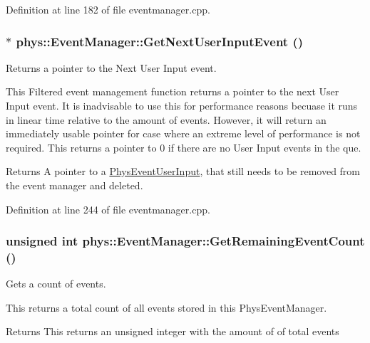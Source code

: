 Definition at line 182 of file eventmanager.cpp.

\hypertarget{classphys_1_1EventManager_ad61b660278f03702e0c564c7ad2dbc5d}{
\subsubsection[{GetNextUserInputEvent}]{ $\ast$ phys::EventManager::GetNextUserInputEvent ()}}
\label{da/dde/classphys_1_1EventManager_ad61b660278f03702e0c564c7ad2dbc5d}


Returns a pointer to the Next User Input event. 

This Filtered event management function returns a pointer to the next User Input event. It is inadvisable to use this for performance reasons becuase it runs in linear time relative to the amount of events. However, it will return an immediately usable pointer for case where an extreme level of performance is not required. This returns a pointer to 0 if there are no User Input events in the que. \begin{DoxyReturn}{Returns}
A pointer to a \hyperlink{classPhysEventUserInput}{PhysEventUserInput}, that still needs to be removed from the event manager and deleted. 
\end{DoxyReturn}


Definition at line 244 of file eventmanager.cpp.

\hypertarget{classphys_1_1EventManager_a67b755e3fe888e1305312d0f966f4a06}{
\subsubsection[{GetRemainingEventCount}]{\setlength{\rightskip}{0pt plus 5cm}unsigned int phys::EventManager::GetRemainingEventCount ()}}
\label{da/dde/classphys_1_1EventManager_a67b755e3fe888e1305312d0f966f4a06}


Gets a count of events. 

This returns a total count of all events stored in this PhysEventManager. \begin{DoxyReturn}{Returns}
This returns an unsigned integer with the amount of of total events 
\end{DoxyReturn}


